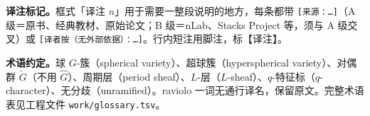\documentclass[UTF8,a4paper,12pt,fontset=fandol,scheme=chinese]{ctexart}
\begin{document}
\textbf{译注标记。}框式「译注 $n$」用于需要一整段说明的地方，每条都带 \texttt{[来源：…]}（A 级＝原书、经典教材、原始论文；B 级＝nLab、Stacks Project 等，须与 A 级交叉）或 \texttt{[译者按（无外部依据）：…]}。行内短注用脚注，标【译注】。

\textbf{术语约定。}球 $G$-簇（spherical variety）、超球簇（hyperspherical variety）、对偶群 $\check G$（不用 $\hat G$）、周期层（period sheaf）、$L$-层（$L$-sheaf）、$q$-特征标（$q$-character）、无分歧（unramified）。raviolo 一词无通行译名，保留原文。完整术语表见工程文件 \texttt{work/glossary.tsv}。

\newpage
\tableofcontents
\newpage
















\end{document}
